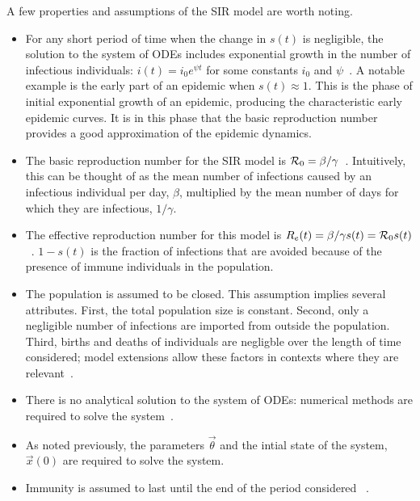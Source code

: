 \documentclass[thesis.tex]{subfiles}
\begin{document}

A few properties and assumptions of the SIR model are worth noting.
\begin{itemize}
    \item For any short period of time when the change in $s(t)$ is negligible, the solution to the system of ODEs includes exponential growth in the number of infectious individuals: $i(t) = i_0 e^{\psi t}$ for some constants $i_0$ and $\psi$~\autocite[section 1.2]{diekmannMathematical}.
    A notable example is the early part of an epidemic when $s(t) \approx 1$.
    This is the phase of initial exponential growth of an epidemic, producing the characteristic early epidemic curves.
    It is in this phase that the basic reproduction number provides a good approximation of the epidemic dynamics.
    \item The basic reproduction number for the SIR model is $\mathcal{R}_{0} = \beta / \gamma$~\autocite[20]{keelingModeling}.
    Intuitively, this can be thought of as the mean number of infections caused by an infectious individual per day, $\beta$, multiplied by the mean number of days for which they are infectious, $1/\gamma$.
    \item The effective reproduction number for this model is $R_e(t) = \beta / \gamma s(t) = \mathcal{R}_{0} s(t)$~\autocite{pellisEstimation}.
    $1-s(t)$ is the fraction of infections that are avoided because of the presence of immune individuals in the population.
    \item The population is assumed to be closed.
    This assumption implies several attributes.
    First, the total population size is constant.
    Second, only a negligible number of infections are imported from outside the population.
    Third, births and deaths of individuals are negligble over the length of time considered; model extensions allow these factors in contexts where they are relevant~\autocites[26]{keelingModeling}[214]{kretzschmarMathematical}.
    \item There is no analytical solution to the system of ODEs: numerical methods are required to solve the system~\autocite[25]{keelingModeling}.
    \item As noted previously, the parameters $\vec{\theta}$ and the intial state of the system, $\vec{x}(0)$ are required to solve the system.
    \item Immunity is assumed to last until the end of the  period considered ~\autocite[61]{andersonInfectious}.

\end{itemize}
\end{document}
